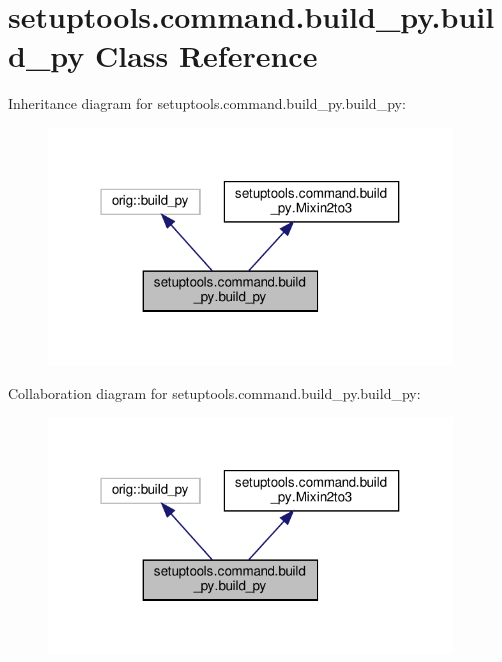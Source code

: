 \hypertarget{classsetuptools_1_1command_1_1build__py_1_1build__py}{}\section{setuptools.\+command.\+build\+\_\+py.\+build\+\_\+py Class Reference}
\label{classsetuptools_1_1command_1_1build__py_1_1build__py}


Inheritance diagram for setuptools.\+command.\+build\+\_\+py.\+build\+\_\+py\+:
\nopagebreak
\begin{figure}[H]
\begin{center}
\leavevmode
\includegraphics[width=304pt]{classsetuptools_1_1command_1_1build__py_1_1build__py__inherit__graph}
\end{center}
\end{figure}


Collaboration diagram for setuptools.\+command.\+build\+\_\+py.\+build\+\_\+py\+:
\nopagebreak
\begin{figure}[H]
\begin{center}
\leavevmode
\includegraphics[width=304pt]{classsetuptools_1_1command_1_1build__py_1_1build__py__coll__graph}
\end{center}
\end{figure}
